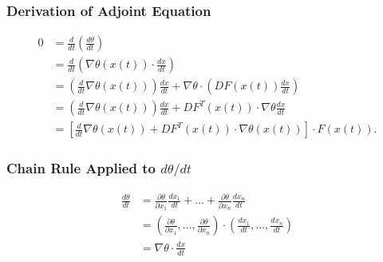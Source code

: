 \documentclass{beamer}
\begin{document}
\begin{frame}
 \frametitle{Derivation of Adjoint Equation}
 \begin{equation}
\begin{split}
 0 &= \frac{d}{dt}\left(\frac{d\theta}{dt} \right)\\
 &=\frac{d}{dt}\left(\nabla\theta(x(t)) \cdot \frac{dx}{dt} \right)\\
 &=\left(\frac{d}{dt}\nabla\theta(x(t))\right) \frac{dx}{dt} + \nabla\theta\cdot\left(DF(x(t)) \frac{dx}{dt}\right)\\
 &=\left(\frac{d}{dt}\nabla\theta(x(t))\right) \frac{dx}{dt} + DF^T(x(t)) \cdot\nabla\theta  \frac{dx}{dt}\\
 &=\left [ \frac{d}{dt} \nabla \theta(x(t)) + DF^T(x(t))\cdot\nabla\theta(x(t)) \right ] \cdot F(x(t)).
\end{split}
\end{equation}
\end{frame}

\begin{frame}
 \frametitle{Chain Rule Applied to $d\theta/dt$}
 \begin{equation}
\begin{split}
 \frac{d\theta}{dt} &= \frac{\partial \theta}{\partial x_1}\frac{d x_1}{dt} + ... + \frac{\partial \theta}{\partial x_n}\frac{d x_n}{dt}\\
 &=\left (\frac{\partial \theta}{\partial x_1}, ..., \frac{\partial \theta}{\partial x_n} \right ) \cdot \left ( \frac{d x_1}{dt}, ..., \frac{d x_n}{dt}\right )\\
 &= \nabla \theta \cdot \frac{dx}{dt}
\end{split}
\end{equation}
\end{frame}
\end{document}
